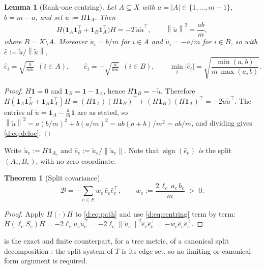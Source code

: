 \documentclass[11pt]{article}
\theoremstyle{plain}
\newtheorem{theorem}{Theorem}
\newtheorem{lemma}{Lemma}
\theoremstyle{definition}
\theoremstyle{remark}
\providecommand{\Bop}{\mathcal{B}}           %
\providecommand{\1}{\mathbf{1}}
\providecommand{\norm}[1]{\left\lVert #1 \right\rVert}
\newcommand{\ehat}{\hat{e}}
\begin{document}
\begin{lemma}[Rank-one centring]\label{d:lem:centring}
Let $A\subseteq X$ with $a=|A|\in\{1,\dots,m-1\}$, $b=m-a$, and set
$\tilde u:=H\1_A$. Then
\begin{equation}\label{d:eq:centring}
  H\bigl(\1_A\1_{B}^\top+\1_{B}\1_A^\top\bigr)H=-2\,\tilde u\tilde u^\top,
  \qquad
  \norm{\tilde u}^2=\frac{ab}{m},
\end{equation}
where $B=X\setminus A$. Moreover $\tilde u_i=b/m$ for $i\in A$ and
$\tilde u_i=-a/m$ for $i\in B$, so with $\ehat:=\tilde u/\norm{\tilde u}$,
\begin{equation}\label{d:eq:deloc}
  \ehat_i=\sqrt{\tfrac{b}{am}}\ \ (i\in A),\qquad
  \ehat_i=-\sqrt{\tfrac{a}{bm}}\ \ (i\in B),\qquad
  \min_{i}|\ehat_i|=\sqrt{\frac{\min(a,b)}{m\,\max(a,b)}} .
\end{equation}
\end{lemma}

\begin{proof}
$H\1=0$ and $\1_B=\1-\1_A$, hence $H\1_B=-\tilde u$. Therefore
$H(\1_A\1_B^\top+\1_B\1_A^\top)H
 =(H\1_A)(H\1_B)^\top+(H\1_B)(H\1_A)^\top
 =-2\tilde u\tilde u^\top$.
The entries of $\tilde u=\1_A-\tfrac{a}{m}\1$ are as stated, so
$\norm{\tilde u}^2=a(b/m)^2+b(a/m)^2=ab(a+b)/m^2=ab/m$, and dividing gives
\eqref{d:eq:deloc}.
\end{proof}

Write $\tilde u_e:=H\1_{A_e}$ and $\ehat_e:=\tilde u_e/\norm{\tilde u_e}$.
Note that $\operatorname{sign}(\ehat_e)$ \emph{is} the split $(A_e,B_e)$, with no
zero coordinate.

\begin{theorem}[Split covariance]\label{d:thm:splitcov}
\begin{equation}\label{d:eq:splitcov}
  \Bop=-\sum_{e\in E}w_e\,\ehat_e\ehat_e^\top,
  \qquad
  w_e:=\frac{2\,\ell_e\,a_e\,b_e}{m}\;>\;0 .
\end{equation}
\end{theorem}

\begin{proof}
Apply $H(\cdot)H$ to \eqref{d:eq:path} and use \eqref{d:eq:centring} term by
term: $H(\ell_eS_e)H=-2\ell_e\tilde u_e\tilde u_e^\top
=-2\ell_e\norm{\tilde u_e}^2\ehat_e\ehat_e^\top=-w_e\ehat_e\ehat_e^\top$.
\end{proof}

 is the exact and finite counterpart, for a tree metric, of
a canonical split decomposition \cite{bandeltdress1992canonical}: the split
system of $T$ is its edge set, so no limiting or canonical-form argument is
required.
\end{document}
